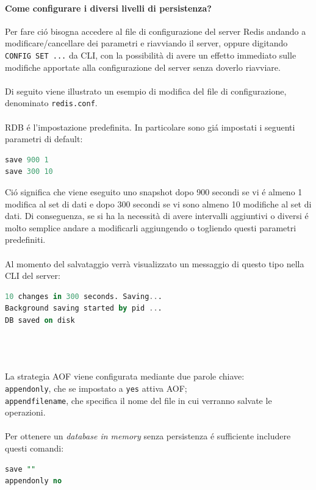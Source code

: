 \paragraph{Come configurare i diversi livelli di persistenza?\\}
Per fare ció bisogna accedere al file di configurazione del server Redis andando a modificare/cancellare dei parametri e riavviando il server,
oppure digitando \texttt{CONFIG SET ...} da CLI, con la possibilità di avere un effetto immediato sulle modifiche apportate alla configurazione del server senza doverlo riavviare.\\
\\
Di seguito viene illustrato un esempio di modifica del file di configurazione, denominato \texttt{redis.conf}.\\
\\
RDB é l'impostazione predefinita. In particolare sono giá impostati i seguenti parametri di default:
\begin{lstlisting}[autogobble, style=redis-cli, language=SQL]
save 900 1
save 300 10\end{lstlisting}
Ció significa che viene eseguito uno snapshot dopo 900 secondi se vi é almeno 1 modifica al set di dati e dopo
300 secondi se vi sono almeno 10 modifiche al set di dati.
Di conseguenza, se si ha la necessità di avere intervalli aggiuntivi o diversi é molto semplice andare a modificarli aggiungendo o togliendo questi parametri predefiniti.\\
\\
Al momento del salvataggio verrà visualizzato un messaggio di questo tipo nella CLI del server:
\begin{lstlisting}[autogobble, style=redis-cli, language=SQL]
10 changes in 300 seconds. Saving...
Background saving started by pid ...
DB saved on disk\end{lstlisting}\\
\\
\\
La strategia AOF viene configurata mediante due parole chiave:\\
\texttt{appendonly}, che se impostato a \texttt{yes} attiva AOF;\\
\texttt{appendfilename}, che specifica il nome del file in cui verranno salvate le operazioni.\\
\\
Per ottenere un \emph{database in memory} senza persistenza é sufficiente includere questi comandi:
\begin{lstlisting}[autogobble, style=redis-cli, language=SQL]
save ""
appendonly no\end{lstlisting}



